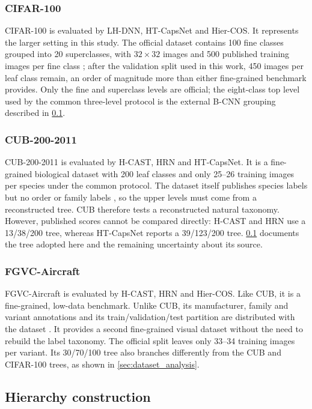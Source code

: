 \subsubsection{CIFAR-100}
CIFAR-100 is evaluated by LH-DNN, HT-CapsNet and Hier-COS. It represents the
larger setting in this study. The official dataset contains 100 fine classes grouped into 20 superclasses, with
$32\times32$ images and 500 published training images per fine class
\cite{krizhevsky2009learning}; after the validation split used in this work, 450 images per leaf
class remain, an order of magnitude more than either fine-grained benchmark provides. Only the fine
and superclass levels are official; the eight-class
top level used by the common three-level protocol is the external B-CNN grouping described in
\cref{sec:hierarchy_construction}.

\subsubsection{CUB-200-2011}
CUB-200-2011 is evaluated by H-CAST, HRN and HT-CapsNet. It is a fine-grained biological
dataset with 200 leaf classes and only 25--26 training images per species under the common
protocol. The dataset itself publishes species labels but no order or family labels
\cite{wah2011caltech}, so the upper levels must come from a reconstructed tree.
CUB therefore tests a reconstructed natural taxonomy. However, published scores
cannot be compared directly: H-CAST and HRN use a 13/38/200 tree, whereas HT-CapsNet reports a
39/123/200 tree. \cref{sec:hierarchy_construction} documents the tree adopted here and the
remaining uncertainty about its source.

\subsubsection{FGVC-Aircraft}
FGVC-Aircraft is evaluated by H-CAST, HRN and Hier-COS. Like CUB, it is a
fine-grained, low-data benchmark. Unlike CUB, its manufacturer, family and variant annotations and
its train/validation/test partition are distributed with the dataset \cite{maji2013fine}. It
provides a second fine-grained visual dataset without the need to rebuild the
label taxonomy. The official split leaves only 33--34 training images per variant.
Its 30/70/100 tree also branches differently from the CUB and CIFAR-100 trees, as
shown in \cref{sec:dataset_analysis}.


\subsection{Hierarchy construction}
\label{sec:hierarchy_construction}

